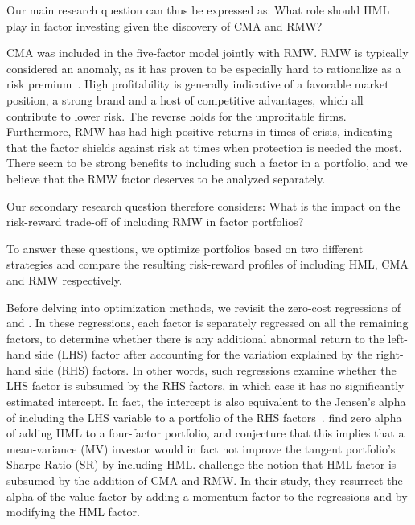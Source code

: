 Our main research question can thus be expressed as: What role should HML play in factor investing given the discovery of CMA and RMW?

CMA was included in the five-factor model jointly with RMW. RMW is typically considered an anomaly, as it has proven to be especially hard to rationalize as a risk premium~\autocite{Wang2013}. High profitability is generally indicative of a favorable market position, a strong brand and a host of competitive advantages, which all contribute to lower risk. The reverse holds for the unprofitable firms. Furthermore, RMW has had high positive returns in times of crisis, indicating that the factor shields against risk at times when protection is needed the most. There seem to be strong benefits to including such a factor in a portfolio, and we believe that the RMW factor deserves to be analyzed separately.

Our secondary research question therefore considers: What is the impact on the risk-reward trade-off of including RMW in factor portfolios? 

To answer these questions, we optimize portfolios based on two different strategies and compare the resulting risk-reward profiles of including HML, CMA and RMW respectively.

Before delving into optimization methods, we revisit the zero-cost regressions of \textcite{FF2015} and \textcite{Asness2015}. In these regressions, each factor is separately regressed on all the remaining factors, to determine whether there is any additional abnormal return to the left-hand side (LHS) factor after accounting for the variation explained by the right-hand side (RHS) factors. In other words, such regressions examine whether the LHS factor is subsumed by the RHS factors, in which case it has no significantly estimated intercept. In fact, the intercept is also equivalent to the Jensen's alpha of including the LHS variable to a portfolio of the RHS factors~\autocite{Jensen1968}. \textcite{FF2015} find zero alpha of adding HML to a four-factor portfolio, and conjecture that this implies that a mean-variance (MV) investor would in fact not improve the tangent portfolio's Sharpe Ratio (SR) by including HML. \textcite{Asness2015} challenge the notion that HML factor is subsumed by the addition of CMA and RMW. In their study, they resurrect the alpha of the value factor by adding a momentum factor to the regressions and by modifying the HML factor.

